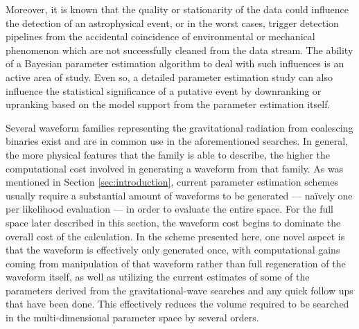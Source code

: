 Moreover, it is known\cite{glitch,detchar,glitch_pe} that the quality or stationarity of the data could influence the detection of an astrophysical event, or in the worst cases, trigger detection pipelines from the accidental coincidence of environmental or mechanical phenomenon which are not successfully cleaned from the data stream. The ability of a Bayesian parameter estimation algorithm to deal with such influences is an active area of study\cite{glitchfitting}. Even so, a detailed parameter estimation study can also influence the statistical significance of a putative event by downranking or upranking based on the model support from the parameter estimation itself.

Several waveform families representing the gravitational radiation from coalescing binaries exist and are in common use in the aforementioned searches\cite{waveforms}. In general, the more physical features that the family is able to describe, the higher the computational cost involved in generating a waveform from that family. As was mentioned in Section \ref{sec:introduction}, current parameter estimation schemes usually require a substantial amount of waveforms to be generated --- na\"ively one per likelihood evaluation --- in order to evaluate the entire space. For the full space later described in this section, the waveform cost begins to dominate the overall cost of the calculation. In the scheme presented here, one novel aspect is that the waveform is effectively only generated once, with computational gains coming from manipulation of that waveform rather than full regeneration of the waveform itself, as well as utilizing the current estimates of some of the parameters derived from the gravitational-wave searches and any quick follow ups that have been done. This effectively reduces the volume required to be searched in the multi-dimensional parameter space by several orders.


